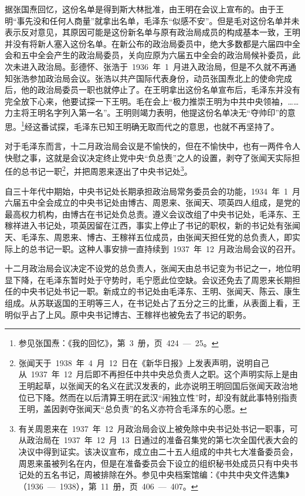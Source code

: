 据张国焘回忆，这份名单是得到斯大林批准，由王明在会议上宣布的。由于王明“事先没和任何人商量”就拿出名单，毛泽东“似感不安”。但是毛对这份名单并未表示反对意见，其原因可能是这份新名单与原有政治局成员的构成基本一致，王明并没有将新人塞入这份名单。在新公布的政治局委员中，绝大多数都是六届四中全会和五中全会产生的政治局委员，关向应原为六届五中全会的政治局候补委员，此次未进入政治局。彭德怀、张浩于~1936~年~1~月进入政治局，但是不久就不再通知张浩参加政治局会议。张浩以共产国际代表身份，动员张国焘北上的使命完成后，他的政治局委员一职也就停止了。在王明拿出这份名单宣布后，毛泽东并没有完全放下心来，他要试探一下王明。毛在会上“极力推崇王明为中共中央领袖，……力主将王明名字列入第一名”。王明则竭力表明，他提这份名单决无“夺帅印”的意思。\footnote{参见张国焘：《我的回忆》，第~3~册，页~424~—~25。}经这番试探，毛泽东已知王明确无取而代之的意思，也就不再坚持了。

对于毛泽东而言，十二月政治局会议是不愉快的，但在不愉快中，也有一两件令人快慰之事，这就是会议决定终止党中央“负总责”之人的设置，剥夺了张闻天实际担任的总书记一职\footnote{张闻天于~1938~年~4~月~12~日在《新华日报》上发表声明，说明自己从~1937~年~12~月后即不再担任中共中央总负责人之职。这个声明实际上是由王明起草，以张闻天的名义在武汉发表的，此亦说明王明回国后张闻天政治地位已下降。然而在以后清算王明在武汉“闹独立性”时，却没有就此事特别指责王明，盖因剥夺张闻天“总负责”的名义亦符合毛泽东的心愿。}，并把周恩来逐出了中央书记处\footnote{有关周恩来在~1937~年~12~月政治局会议上被免除中央书记处书记一职事，可从政治局在~1937~年~12~月~13~日通过的准备召集党的第七次全国代表大会的决议中得到证实。该决议宣布，成立由二十五人组成的中共七大准备委员会，周恩来虽被列名在内，但是在准备委员会下设立的组织秘书处成员只有中央书记处的五名书记，周被排除在外。参见中央档案馆编：《中共中央文件选集》（1936~—~1938），第~11~册，页~406~—~407。}。

自三十年代中期始，中央书记处长期承担政治局常务委员会的功能，1934~年~1~月六届五中全会成立的中央书记处由博古、周恩来、张闻天、项英四人组成，是党的最高权力机构，由博古在书记处负总责。遵义会议改组了中央书记处，毛泽东、王稼祥进入书记处，项英因留在江西，事实上停止了书记的职权，新的书记处有张闻天、毛泽东、周恩来、博古、王稼祥五位成员，由张闻天担任党的总负责人，即实际上的总书记一职。这种人事安排一直持续到~1937~年~12~月政治局会议的召开。

十二月政治局会议决定不设党的总负责人，张闻天由总书记变为书记之一，地位明显下降，在毛泽东暂时处于守势时，毛宁愿此位空缺。会议还免去了周恩来长期担任的中央书记处书记一职。新成立的书记处由毛泽东、王明、张闻天、陈云、康生组成。从苏联返国的王明等三人，在书记处占了五分之三的比重，从表面上看，王明似乎占了上风。原中央书记博古、王稼祥也被免去了书记的职务。

